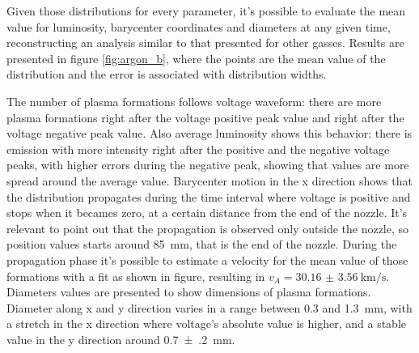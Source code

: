 Given those distributions for every parameter, it's possible to evaluate the mean value for luminosity, barycenter coordinates and diameters at any given time, reconstructing an analysis similar to that presented for other gasses. Results are presented in figure \ref{fig:argon_b}, where the points are the mean value of the distribution and the error is associated with distribution widths.

The number of plasma formations follows voltage waveform: there are more plasma formations right after the voltage positive peak value and right after the voltage negative peak value. Also average luminosity shows this behavior: there is emission with more intensity right after the positive and the negative voltage peaks, with higher errors during the negative peak, showing that values are more spread around the average value.
Barycenter motion in the x direction shows that the distribution propagates during the time interval where voltage is positive and stops when it becames zero, at a certain distance from the end of the nozzle. It's relevant to point out that the propagation is observed only outside the nozzle, so position values starts around \SI{85}{\milli\meter}, that is the end of the nozzle. During the propagation phase it's possible to estimate a velocity for the mean value of those formations with a fit as shown in figure, resulting in $v_A = \SI{30.16(356)}{\kilo\meter/\second}$.
Diameters values are presented to show dimensions of plasma formations. Diameter along x and y direction varies in a range between \num{0.3} and \SI{1.3}{\milli\meter}, with a stretch in the x direction where voltage's absolute value is higher, and a stable value in the y direction around \SI{0.7(2)}{\milli\meter}. 

